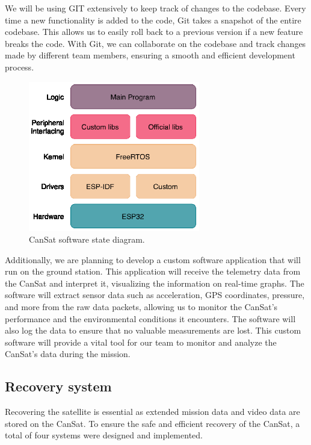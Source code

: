 \documentclass[11pt]{article}
\begin{document}
We will be using GIT extensively to keep track of changes to the codebase. Every time a new functionality is added to the code, Git takes a snapshot of the entire codebase. This allows us to easily roll back to a previous version if a new feature breaks the code. With Git, we can collaborate on the codebase and track changes made by different team members, ensuring a smooth and efficient development process.

\begin{figure}
    \centering
    \includegraphics[width=7.5cm]{images/img_Cansat_RTOS.eps}
    \caption{\small{CanSat software state diagram.}}
    \label{fig:rtos}
\end{figure}



Additionally, we are planning to develop a custom software application that will run on the ground station. This application will receive the telemetry data from the CanSat and interpret it, visualizing the information on real-time graphs. The software will extract sensor data such as acceleration, GPS coordinates, pressure, and more from the raw data packets, allowing us to monitor the CanSat's performance and the environmental conditions it encounters. The software will also log the data to ensure that no valuable measurements are lost. This custom software will provide a vital tool for our team to monitor and analyze the CanSat's data during the mission.

\subsection{Recovery system}
Recovering the satellite is essential as extended mission data and video data are stored on the
CanSat. To ensure the safe and efficient recovery of the CanSat, a total of four systems were designed and implemented. 
\end{document}
